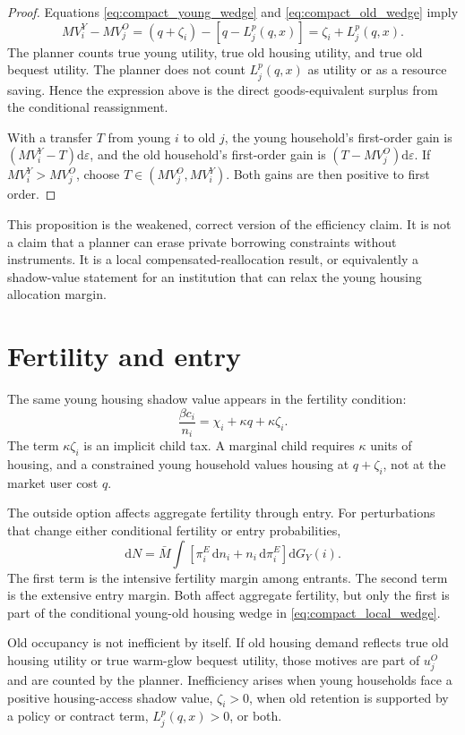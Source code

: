 \documentclass[11pt]{article}
\newcommand{\dd}{\mathrm d}
\newcommand{\1}{\mathbf 1}
\begin{document}
\begin{proof}
Equations \eqref{eq:compact_young_wedge} and \eqref{eq:compact_old_wedge} imply
\[
MV_i^Y-MV_j^O
=
(q+\zeta_i)-\left[q-L_j^p(q,x)\right]
=
\zeta_i+L_j^p(q,x).
\]
The planner counts true young utility, true old housing utility, and true old bequest utility. The planner does not count $L_j^p(q,x)$ as utility or as a resource saving. Hence the expression above is the direct goods-equivalent surplus from the conditional reassignment.

With a transfer $T$ from young $i$ to old $j$, the young household's first-order gain is $(MV_i^Y-T)\dd\varepsilon$, and the old household's first-order gain is $(T-MV_j^O)\dd\varepsilon$. If $MV_i^Y>MV_j^O$, choose $T\in(MV_j^O,MV_i^Y)$. Both gains are then positive to first order.
\end{proof}

This proposition is the weakened, correct version of the efficiency claim. It is not a claim that a planner can erase private borrowing constraints without instruments. It is a local compensated-reallocation result, or equivalently a shadow-value statement for an institution that can relax the young housing allocation margin.

\section{Fertility and entry}

The same young housing shadow value appears in the fertility condition:
\[
\frac{\beta c_i}{n_i}
=
\chi_i+\kappa q+\kappa\zeta_i.
\]
The term $\kappa\zeta_i$ is an implicit child tax. A marginal child requires $\kappa$ units of housing, and a constrained young household values housing at $q+\zeta_i$, not at the market user cost $q$.

The outside option affects aggregate fertility through entry. For perturbations that change either conditional fertility or entry probabilities,
\begin{equation}
\dd N
=
\bar M
\int
\left[
\pi_i^E\,\dd n_i
+
n_i\,\dd\pi_i^E
\right]\dd G_Y(i).
\label{eq:compact_entry_fertility}
\end{equation}
The first term is the intensive fertility margin among entrants. The second term is the extensive entry margin. Both affect aggregate fertility, but only the first is part of the conditional young-old housing wedge in \eqref{eq:compact_local_wedge}.

Old occupancy is not inefficient by itself. If old housing demand reflects true old housing utility or true warm-glow bequest utility, those motives are part of $u_j^O$ and are counted by the planner. Inefficiency arises when young households face a positive housing-access shadow value, $\zeta_i>0$, when old retention is supported by a policy or contract term, $L_j^p(q,x)>0$, or both.
\end{document}
